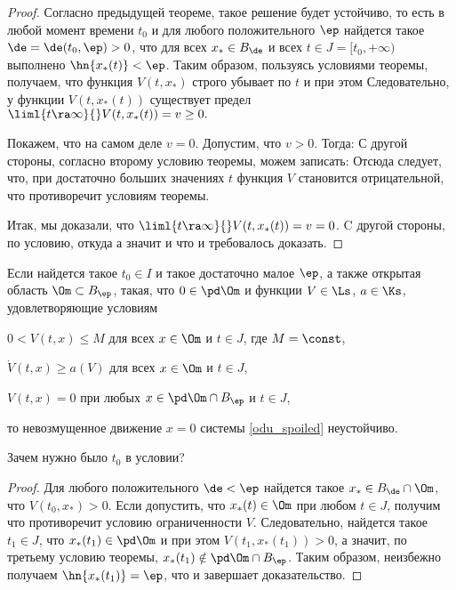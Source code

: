 \documentclass[a4paper,12pt]{article}
\def\xtrpicturep#1#2{\vadjust{\vbox{%
\vskip.5pc
\centerline{\epsfbox{pictures.#1}}
\vskip2pt
\centerline{\footnotesize\normalfont\textbf{Рис.~#2}}
\vskip.5pc}}}
\begin{document}
\begin{proof}
Согласно предыдущей теореме, такое решение будет устойчиво, то есть в любой момент времени $t_0$ и
для любого положительного $\ep$ найдется такое $\de=\de(t_0,\ep)>0$, что
для всех $x_*\in B_\de$ и всех $t\in J=[t_0,+\infty)$ выполнено $\hn{x_*(t)}<\ep$.
Таким образом, пользуясь условиями
теоремы, получаем, что функция $V(t,x_*)$ строго убывает по $t$ и при этом  Следовательно, у функции $V(t,x_*(t))$ существует предел
$\liml{t\ra\infty}{}V(t,x_*(t))=v\ge0.$

Покажем, что на самом деле $v=0$. Допустим, что $v>0$. Тогда:
С другой стороны, согласно второму
условию теоремы, можем записать:
Отсюда следует, что, при достаточно больших значениях $t$ функция $V$
становится отрицательной, что противоречит условиям теоремы.

Итак, мы доказали, что $\liml{t\ra\infty}{}V(t,x_*(t))=v=0$. C другой стороны, по условию,
откуда
 а значит и
что и требовалось доказать.
\end{proof}

\begin{theorem}[Н.\,Г.\,Четаев]
Если найдется такое $t_0\in I$ и такое достаточно малое $\ep$,
а также открытая область $\Om\subset B_\ep$, такая, что
$0\in\pd\Om$ и функции $V\in\Ls$, $a\in\Ks$,
удовлетворяющие условиям
\xtrpicturep{7}{7}
\begin{nums}{-2}
  \item $0<V(t,x)\le M$ для всех $x\in\Om$ и $t\in J$, где $M = \const$,
  \item $\dot{V}(t,x)\ge a(V)$ для всех $x\in\Om$ и $t\in J$,
  \item $V(t,x)=0$ при любых $x\in\pd\Om\cap B_{\ep}$ и $t\in J$,
\end{nums}
то невозмущенное движение $x=0$ системы \eqref{odu_spoiled} неустойчиво.
\end{theorem}
\begin{petit}
  Зачем нужно было $t_0$ в условии?
\end{petit}
\begin{proof}
Для любого положительного $\de<\ep$ найдется такое $x_*\in B_{\de}\cap\Om$, что
$V(t_0,x_*)>0$. Если допустить, что $x_*(t)\in\Om$ при любом $t\in J$, получим
 что противоречит условию ограниченности $V$. Следовательно,
найдется такое $t_1\in J$, что $x_*(t_1)\in\pd\Om$ и при этом $V(t_1,x_*(t_1))>0$, а
значит, по третьему условию теоремы, $x_*(t_1)\notin\pd\Om\cap B_{\ep}$. Таким образом,
неизбежно получаем $\hn{x_*(t_1)}=\ep$, что и завершает доказательство.
\end{proof}
\end{document}

